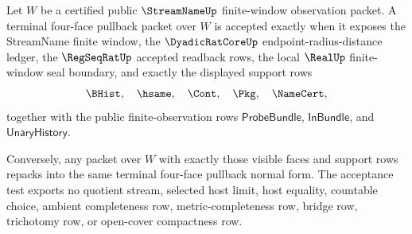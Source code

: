 \begin{theorem}
\label{thm:streamname-terminal-pullback-support-exactness}
Let $W$ be a certified public $\StreamNameUp$ finite-window observation
packet. A terminal four-face pullback packet over $W$ is accepted exactly when
it exposes the StreamName finite window, the $\DyadicRatCoreUp$
endpoint-radius-distance ledger, the $\RegSeqRatUp$ accepted readback rows,
the local $\RealUp$ finite-window seal boundary, and exactly the displayed
support rows
$$
\BHist,\quad \hsame,\quad \Cont,\quad \Pkg,\quad \NameCert,
$$
together with the public finite-observation rows
$\mathsf{ProbeBundle}$, $\mathsf{InBundle}$, and
$\mathsf{UnaryHistory}$.

Conversely, any packet over $W$ with exactly those visible faces and support
rows repacks into the same terminal four-face pullback normal form. The
acceptance test exports no quotient stream, selected host limit, host
equality, countable choice, ambient completeness row, metric-completeness row,
bridge row, trichotomy row, or open-cover compactness row.
\end{theorem}
